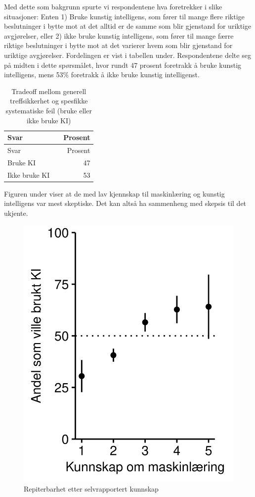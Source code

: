 \documentclass[
  12pt,
  a4paper, 12pt]{article}
\begin{document}
Med dette som bakgrunn spurte vi respondentene hva foretrekker i slike situasjoner:
Enten 1) Bruke kunstig intelligens, som fører til mange flere riktige beslutninger i bytte mot at det alltid er de samme som blir gjenstand for uriktige avgjørelser, eller 2) ikke bruke kunstig intelligens, som fører til mange færre riktige beslutninger i bytte mot at det varierer hvem som blir gjenstand for uriktige avgjørelser.
Fordelingen er vist i tabellen under.
Respondentene delte seg på midten i dette spørsmålet, hvor rundt 47 prosent foretrakk å bruke kunstig intelligens, mens 53\% foretrakk å ikke bruke kunstig intelligenst.

\begin{longtable}[]{@{}llr@{}}
\caption{\label{tab:relval} Tradeoff mellom generell treffsikkerhet og spesfikke systematiske feil (bruke eller ikke bruke KI)}\tabularnewline
\toprule
Svar & & Prosent \\
\midrule
\endfirsthead
\toprule
Svar & & Prosent \\
\midrule
\endhead
Bruke KI & & 47 \\
Ikke bruke KI & & 53 \\
\bottomrule
\end{longtable}

Figuren under viser at de med lav kjennskap til maskinlæring og kunstig intelligens var mest skeptiske.
Det kan altså ha sammenheng med skepsis til det ukjente.

\begin{figure}

{\centering \includegraphics[width=0.5\linewidth]{figs/png/fig_relval_ml_know} 

}

\caption{Repiterbarhet etter selvrapportert kunnskap}\label{fig:unnamed-chunk-23}
\end{figure}
\end{document}

